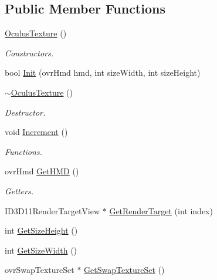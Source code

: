 \subsection*{Public Member Functions}
\begin{DoxyCompactItemize}
\item 
\hyperlink{class_oculus_texture_ad3cc67fb9d31fe41675592f23abc5e47}{Oculus\+Texture} ()
\begin{DoxyCompactList}\small\item\em Constructors. \end{DoxyCompactList}\item 
bool \hyperlink{class_oculus_texture_a4c3211813aec38c62d198f5d2f8b5c58}{Init} (ovr\+Hmd hmd, int size\+Width, int size\+Height)
\item 
\hyperlink{class_oculus_texture_a6626d481b7b535f8aa49762bf1753071}{$\sim$\+Oculus\+Texture} ()
\begin{DoxyCompactList}\small\item\em Destructor. \end{DoxyCompactList}\item 
void \hyperlink{class_oculus_texture_afff2c510620b5aa2d2413b4fc27ce114}{Increment} ()
\begin{DoxyCompactList}\small\item\em Functions. \end{DoxyCompactList}\item 
ovr\+Hmd \hyperlink{class_oculus_texture_a3726005d9453f8616a47e735b677cb5c}{Get\+H\+MD} ()
\begin{DoxyCompactList}\small\item\em Getters. \end{DoxyCompactList}\item 
I\+D3\+D11\+Render\+Target\+View $\ast$ \hyperlink{class_oculus_texture_a17d4bcf0866848b28165ac8c0a9d77a2}{Get\+Render\+Target} (int index)
\item 
int \hyperlink{class_oculus_texture_af81b3825a506329b8db16071a5483495}{Get\+Size\+Height} ()
\item 
int \hyperlink{class_oculus_texture_af73833914f0cc424bc1dea0163ffd385}{Get\+Size\+Width} ()
\item 
ovr\+Swap\+Texture\+Set $\ast$ \hyperlink{class_oculus_texture_a826638e17b3c23dc9f9c8076726b73f3}{Get\+Swap\+Texture\+Set} ()
\end{DoxyCompactItemize}
